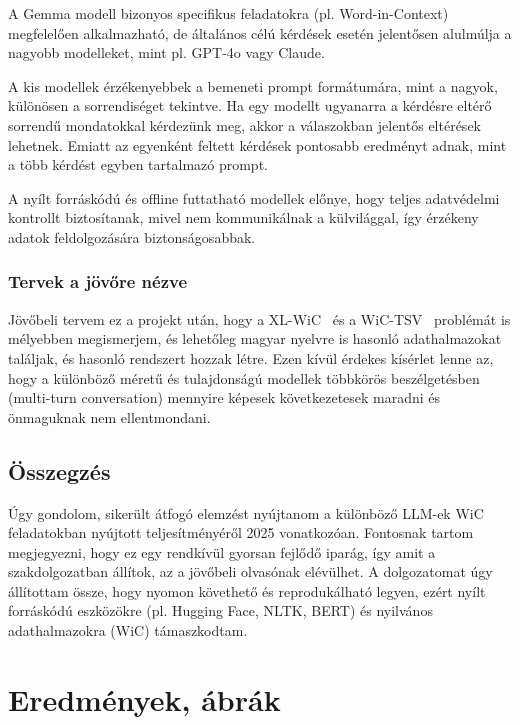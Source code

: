 \documentclass[12pt]{report}
\theoremstyle{definition}
\begin{document}
A Gemma modell bizonyos specifikus feladatokra (pl. Word-in-Context) megfelelően alkalmazható, de általános célú kérdések esetén jelentősen alulmúlja a nagyobb modelleket, mint pl. GPT-4o vagy Claude.

A kis modellek érzékenyebbek a bemeneti prompt formátumára, mint a nagyok, különösen a sorrendiséget tekintve. Ha egy modellt ugyanarra a kérdésre eltérő sorrendű mondatokkal kérdezünk meg, akkor a válaszokban jelentős eltérések lehetnek. Emiatt az egyenként feltett kérdések pontosabb eredményt adnak, mint a több kérdést egyben tartalmazó prompt.

A nyílt forráskódú és offline futtatható modellek előnye, hogy teljes adatvédelmi kontrollt biztosítanak, mivel nem kommunikálnak a külvilággal, így érzékeny adatok feldolgozására biztonságosabbak.

\subsection{Tervek a jövőre nézve}
Jövőbeli tervem ez a projekt után, hogy a XL-WiC~\cite{raganato2020xlwic} és a WiC-TSV~\cite{breit2021wictsv} problémát is mélyebben megismerjem, és lehetőleg magyar nyelvre is hasonló adathalmazokat találjak, és hasonló rendszert hozzak létre. Ezen kívül érdekes kísérlet lenne az, hogy a különböző méretű és tulajdonságú modellek többkörös beszélgetésben (multi-turn conversation) mennyire képesek következetesek maradni és önmaguknak nem ellentmondani.


\section{Összegzés}
Úgy gondolom, sikerült átfogó elemzést nyújtanom a különböző LLM-ek WiC feladatokban nyújtott teljesítményéről 2025  vonatkozóan. Fontosnak tartom megjegyezni, hogy ez egy rendkívül gyorsan fejlődő iparág, így amit a szakdolgozatban állítok, az a jövőbeli olvasónak elévülhet.
A dolgozatomat úgy állítottam össze, hogy nyomon követhető és reprodukálható legyen, ezért nyílt forráskódú eszközökre (pl. Hugging Face, NLTK, BERT) és nyilvános adathalmazokra (WiC) támaszkodtam.

\clearpage

\chapter*{Eredmények, ábrák}
\end{document}
